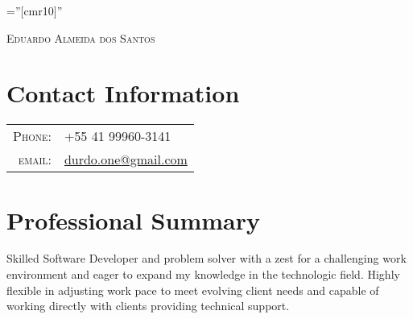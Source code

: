 \documentclass[a4paper,10pt]{article}
\begin{document}
\pagestyle{empty} %

\font\fb=''[cmr10]'' %


\par
{\centering
    {\Huge \textsc{Eduardo Almeida dos Santos}
}\bigskip\par}


\section{Contact Information}

\begin{tabular}{rl}


    \textsc{Phone:}
    & +55 41 99960-3141 \\

    \textsc{email:}
    & \href{mailto:durdo.one@gmail.com}{durdo.one@gmail.com}
\end{tabular}


\section{Professional Summary}
    Skilled Software Developer and problem solver with a zest for a challenging
    work environment and eager to expand my knowledge in the technologic field.
    Highly flexible in adjusting work pace to meet evolving client needs and
    capable of working directly with clients providing technical support.

\end{document}
